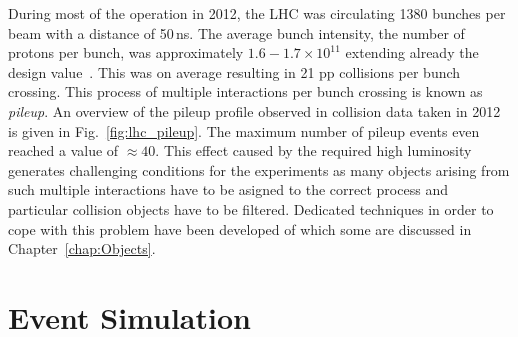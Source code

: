 During most of the operation in 2012, the LHC was circulating 1380 bunches per beam with a distance of 50\,ns. The average bunch intensity, \ie the number of protons per bunch, was approximately $1.6 - 1.7 \times 10^{11}$ extending already the design value~\cite{bib:lhc:lumi12, Lamont:2013cma}. This was on average resulting in 21 pp collisions per bunch crossing. This process of multiple interactions per bunch crossing is known as \textit{pileup}. An overview of the pileup profile observed in collision data taken in 2012 is given in Fig.~\ref{fig:lhc_pileup}. The maximum number of pileup events even reached a value of $\approx 40$. This effect caused by the required high luminosity generates challenging conditions for the experiments as many objects arising from such multiple interactions have to be asigned to the correct process and particular collision objects have to be filtered. Dedicated techniques in order to cope with this problem have been developed of which some are discussed in Chapter~\ref{chap:Objects}.

\section{Event Simulation}
\label{sec:simulation}
